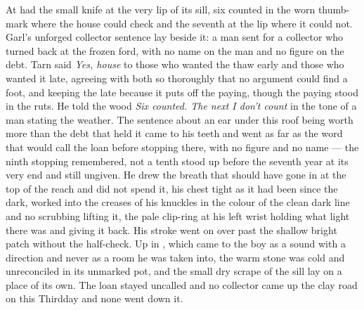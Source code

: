 At   had the small knife at the very lip of its sill, six counted in the worn thumb-mark where the house could check and the seventh at the lip where it could not. Garl's unforged collector sentence lay beside it: a man sent for a collector who turned back at the frozen ford, with no name on the man and no figure on the debt. Tarn said \emph{Yes, house} to those who wanted the thaw early and those who wanted it late, agreeing with both so thoroughly that no argument could find a foot, and keeping the late because it puts off the paying, though the paying stood in the ruts. He told the wood \emph{Six counted. The next I don't count} in the tone of a man stating the weather. The sentence about an ear under this roof being worth more than the debt that held it came to his teeth and went as far as the word that would call the loan before stopping there, with no figure and no name --- the ninth stopping remembered, not a tenth stood up before the seventh year at its very end and still ungiven. He drew the breath that should have gone in at the top of the reach and did not spend it, his chest tight as it had been since the dark,  worked into the creases of his knuckles in the colour of the clean dark line and no scrubbing lifting it, the pale clip-ring at his left wrist holding what light there was and giving it back. His stroke went on over  past the shallow bright patch without the half-check. Up in , which came to the boy as a sound with a direction and never as a room he was taken into, the warm stone was cold and unreconciled in its unmarked pot, and the small dry scrape of the sill lay on a place of its own. The loan stayed uncalled and no collector came up the clay road on this Thirdday and none went down it.

